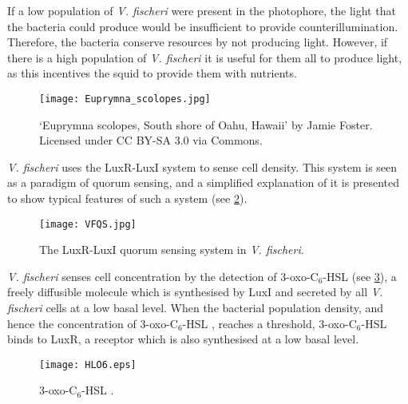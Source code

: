If a low population of \textit{V. fischeri} were present in the photophore, the  light that the bacteria could produce would be insufficient to provide counterillumination. Therefore, the bacteria conserve resources by not producing light.
However, if there is a high population of \textit{V. fischeri} it is useful for them all to produce light, as this incentives the squid to provide them with nutrients. 


\begin{figure}[H]
	\begin{center}
		\texttt{[image: Euprymna\_scolopes.jpg]} 	
		\caption{`Euprymna scolopes, South shore of Oahu, Hawaii' by Jamie Foster. Licensed under CC BY-SA 3.0 via Commons.
		\label{fgr:ES}}
	\end{center}
\end{figure}


\textit{V. fischeri} uses the LuxR-LuxI system to sense cell density. This system is seen as a paradigm of quorum sensing, and a simplified explanation of it is presented to show typical features of such a system (see \ref{fgr:VFQS}).

\begin{figure}[H]
	\begin{center}
		\texttt{[image: VFQS.jpg]}
		\caption{The LuxR-LuxI quorum sensing system in \textit{V. fischeri}. \label{fgr:VFQS}}
	\end{center}
\end{figure}


\textit{V. fischeri} senses cell concentration by the detection of 3-oxo-C$_6$-HSL \cite{Eberhard1981} (see \ref{fgr:HLO6}), a freely diffusible\cite{Kaplan1985} molecule which is synthesised by LuxI\cite{Parsek1999, Watson2002} and secreted by all \textit{V. fischeri} cells\cite{Schaefer1996} at a low basal level\cite{Miller2001}. 
When the bacterial population density, and hence the concentration of 3-oxo-C$_6$-HSL , reaches a threshold, 3-oxo-C$_6$-HSL  binds to LuxR\cite{Hanzelka1995,Choi1991,Choi1992}, a receptor which is also synthesised at a low basal level. 

\begin{figure}[H]
	\begin{center}
		\texttt{[image: HLO6.eps]}
		\caption{3-oxo-C$_6$-HSL . \label{fgr:HLO6}}
	\end{center}
\end{figure}

